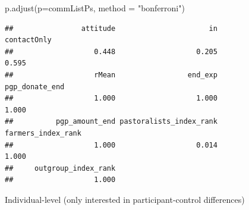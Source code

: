 \documentclass[
]{article}
\newenvironment{Shaded}{\begin{snugshade}}{\end{snugshade}}
\newcommand{\AttributeTok}[1]{\textcolor[rgb]{0.77,0.63,0.00}{#1}}
\newcommand{\FunctionTok}[1]{\textcolor[rgb]{0.00,0.00,0.00}{#1}}
\newcommand{\NormalTok}[1]{#1}
\newcommand{\StringTok}[1]{\textcolor[rgb]{0.31,0.60,0.02}{#1}}
\begin{document}
\begin{Shaded}
\begin{Highlighting}[]
\FunctionTok{p.adjust}\NormalTok{(}\AttributeTok{p=}\NormalTok{commListPs, }\AttributeTok{method =} \StringTok{"bonferroni"}\NormalTok{)}
\end{Highlighting}
\end{Shaded}

\begin{verbatim}
##                attitude                      in             contactOnly 
##                   0.448                   0.205                   0.595 
##                   rMean                 end_exp          pgp_donate_end 
##                   1.000                   1.000                   1.000 
##          pgp_amount_end pastoralists_index_rank      farmers_index_rank 
##                   1.000                   0.014                   1.000 
##     outgroup_index_rank 
##                   1.000
\end{verbatim}

Individual-level (only interested in participant-control differences)
\end{document}
